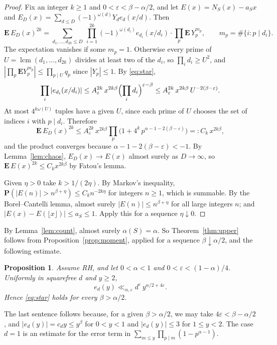 \documentclass[11pt]{amsart}
\newtheorem{proposition}[lemma]{Proposition}
\theoremstyle{remark}
\numberwithin{equation}{section}
\newcommand{\Prob}{\mathbf{P}}
\newcommand{\Ex}{\mathbf{E}}
\newcommand{\eps}{\varepsilon}
\DeclareMathOperator{\lcm}{lcm}
\begin{document}
\begin{proof}
Fix an integer $k\ge1$ and $0<\eps<\beta-\alpha/2$, and let $E(x)=N_S(x)-a_Sx$ and $E_D(x)=\sum_{d\le D}(-1)^{\omega(d)}Y_de_d(x/d)$. Then
\[
\Ex\,E_D(x)^{2k}=\sum_{d_1,\dots,d_{2k}\le D}\ \prod_{i=1}^{2k}(-1)^{\omega(d_i)}e_{d_i}(x/d_i)\cdot\prod_p\Ex\,Y_p^{m_p},\qquad m_p=\#\{i:p\mid d_i\}.
\]
The expectation vanishes if some $m_p=1$. Otherwise every prime of $U=\lcm(d_1,\dots,d_{2k})$ divides at least two of the $d_i$, so $\prod_id_i\ge U^2$, and $|\prod_p\Ex Y_p^{m_p}|\le\prod_{p\mid U}q_p$ since $|Y_p|\le1$. By \eqref{eq:star},
\[
\prod_i|e_{d_i}(x/d_i)|\le A_\eps^{2k}\,x^{2k\beta}\Bigl(\prod_id_i\Bigr)^{\eps-\beta}\le A_\eps^{2k}\,x^{2k\beta}\,U^{-2(\beta-\eps)} .
\]
At most $4^{k\omega(U)}$ tuples have a given $U$, since each prime of $U$ chooses the set of indices $i$ with $p\mid d_i$. Therefore
\[
\Ex\,E_D(x)^{2k}\le A_\eps^{2k}\,x^{2k\beta}\prod_p\bigl(1+4^k\,p^{\alpha-1-2(\beta-\eps)}\bigr)=:C_k\,x^{2k\beta},
\]
and the product converges because $\alpha-1-2(\beta-\eps)<-1$. By Lemma~\ref{lem:chaos}, $E_D(x)\to E(x)$ almost surely as $D\to\infty$, so $\Ex\,E(x)^{2k}\le C_kx^{2k\beta}$ by Fatou's lemma.

Given $\eta>0$ take $k>1/(2\eta)$. By Markov's inequality, $\Prob(|E(n)|>n^{\beta+\eta})\le C_kn^{-2k\eta}$ for integers $n\ge1$, which is summable. By the Borel--Cantelli lemma, almost surely $|E(n)|\le n^{\beta+\eta}$ for all large integers $n$; and $|E(x)-E(\lfloor x\rfloor)|\le a_S\le1$. Apply this for a sequence $\eta\downarrow0$.
\end{proof}

By Lemma~\ref{lem:count}, almost surely $\alpha(S)=\alpha$. So Theorem~\ref{thm:upper} follows from Proposition~\ref{prop:moment}, applied for a sequence $\beta\downarrow\alpha/2$, and the following estimate.

\begin{proposition}\label{prop:ed}
Assume RH, and let $0<\alpha<1$ and $0<\eps<(1-\alpha)/4$. Uniformly in squarefree $d$ and $y\ge2$,
\[
e_d(y)\ll_{\alpha,\eps}d^{\eps}\,y^{\alpha/2+4\eps}.
\]
Hence \eqref{eq:star} holds for every $\beta>\alpha/2$.
\end{proposition}

The last sentence follows because, for a given $\beta>\alpha/2$, we may take $4\eps<\beta-\alpha/2$, and $|e_d(y)|=c_dy\le y^{\beta}$ for $0<y<1$ and $|e_d(y)|\le3$ for $1\le y<2$. The case $d=1$ is an estimate for the error term in $\sum_{m\le y}\prod_{p\mid m}(1-p^{\alpha-1})$.
\end{document}
